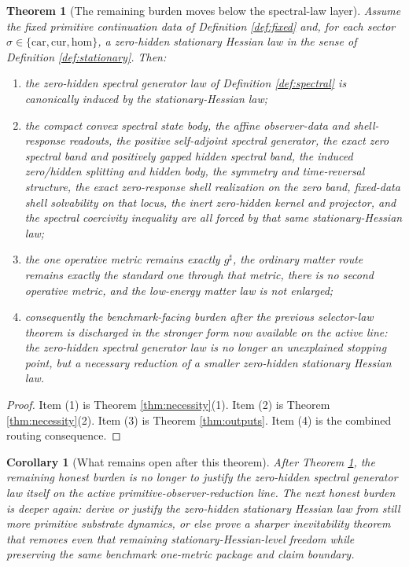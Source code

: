 \documentclass[11pt]{article}
\newcommand{\CompletedMetric}{g^{\sharp}}
\newcommand{\Car}{\mathrm{car}}
\newcommand{\Cur}{\mathrm{cur}}
\newcommand{\Hom}{\mathrm{hom}}
\newtheorem{corollary}{Corollary}
\newtheorem{theorem}{Theorem}
\begin{document}
\begin{theorem}[The remaining burden moves below the spectral-law layer]
\label{thm:main}
Assume the fixed primitive continuation data of Definition \ref{def:fixed} and, for each sector \(\sigma\in\{\Car,\Cur,\Hom\}\), a zero-hidden stationary Hessian law in the sense of Definition \ref{def:stationary}. Then:
\begin{enumerate}
    \item the zero-hidden spectral generator law of Definition \ref{def:spectral} is canonically induced by the stationary-Hessian law;
    \item the compact convex spectral state body, the affine observer-data and shell-response readouts, the positive self-adjoint spectral generator, the exact zero spectral band and positively gapped hidden spectral band, the induced zero/hidden splitting and hidden body, the symmetry and time-reversal structure, the exact zero-response shell realization on the zero band, fixed-data shell solvability on that locus, the inert zero-hidden kernel and projector, and the spectral coercivity inequality are all forced by that same stationary-Hessian law;
    \item the one operative metric remains exactly \(\CompletedMetric\), the ordinary matter route remains exactly the standard one through that metric, there is no second operative metric, and the low-energy matter law is not enlarged;
    \item consequently the benchmark-facing burden after the previous selector-law theorem is discharged in the stronger form now available on the active line: the zero-hidden spectral generator law is no longer an unexplained stopping point, but a necessary reduction of a smaller zero-hidden stationary Hessian law.
\end{enumerate}
\end{theorem}

\begin{proof}
Item (1) is Theorem \ref{thm:necessity}(1). Item (2) is Theorem \ref{thm:necessity}(2). Item (3) is Theorem \ref{thm:outputs}. Item (4) is the combined routing consequence.
\end{proof}

\begin{corollary}[What remains open after this theorem]
\label{cor:next}
After Theorem \ref{thm:main}, the remaining honest burden is no longer to justify the zero-hidden spectral generator law itself on the active primitive-observer-reduction line. The next honest burden is deeper again: derive or justify the zero-hidden stationary Hessian law from still more primitive substrate dynamics, or else prove a sharper inevitability theorem that removes even that remaining stationary-Hessian-level freedom while preserving the same benchmark one-metric package and claim boundary.
\end{corollary}
\end{document}
